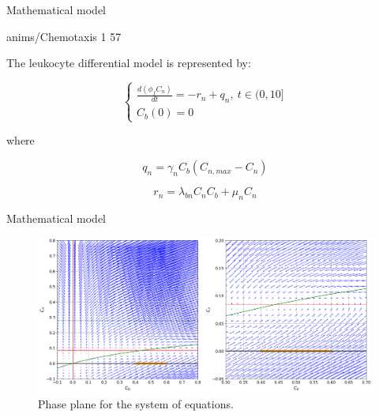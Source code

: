 \documentclass[serif,8pt, aspectratio=169]{beamer}
\begin{document}
    \begin{frame}[fragile]{Mathematical model}
        \begin{minipage}{0.55\linewidth}
            \centering %
            {anims/Chemotaxis}%
            {1}%
            {57}%
        \end{minipage}
        \begin{minipage}{0.4\linewidth}
            The leukocyte differential model is represented by:

            \begin{equation}
            \left\{\begin{matrix}
             \frac{d(\phi_fC_n)}{dt}=-r_n+q_n,~t\in(0,10]\\
             C_b(0) = 0
            \end{matrix}\right.
            \end{equation}

            where 
            
            \begin{equation}
                q_n = \gamma_nC_b(C_{n,max}-C_n)
            \end{equation}

            \begin{equation}
                r_n = \lambda_{bn}C_nC_b+\mu_nC_n
            \end{equation}
        \end{minipage}
    \end{frame}

    \begin{frame}[fragile]{Mathematical model}
        \begin{figure}
            \centering
            \includegraphics[width=0.8\linewidth]{pic/phase_plane.png}
            \caption{Phase plane for the system of equations.}
            \label{fig:phase-plane}
        \end{figure}
    \end{frame}
\end{document}
